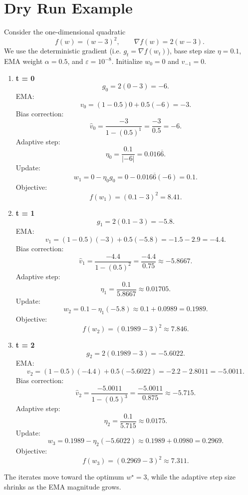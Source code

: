 \documentclass{article}
\begin{document}
\section*{Dry Run Example}
Consider the one‑dimensional quadratic
\[
f(w)=(w-3)^2,\qquad \nabla f(w)=2(w-3).
\]
We use the deterministic gradient (i.e. $g_t=\nabla f(w_t)$), base step size $\eta=0.1$, EMA weight $\alpha=0.5$, and $\varepsilon=10^{-8}$.  
Initialize $w_0=0$ and $v_{-1}=0$.

\begin{enumerate}[label=\textbf{Iteration \arabic*:}]
\item \textbf{t = 0}
    \[
    g_0=2(0-3)=-6.
    \]
    EMA:
    \[
    v_0=(1-0.5)0+0.5(-6)=-3.
    \]
    Bias correction:
    \[
    \hat v_0=\frac{-3}{1-(0.5)^{1}}=\frac{-3}{0.5}=-6.
    \]
    Adaptive step:
    \[
    \eta_0=\frac{0.1}{|{-6}|}=0.016\overline{6}.
    \]
    Update:
    \[
    w_1=0-\eta_0 g_0=0-0.016\overline{6}(-6)=0.1.
    \]
    Objective:
    \[
    f(w_1)=(0.1-3)^2=8.41.
    \]

\item \textbf{t = 1}
    \[
    g_1=2(0.1-3)=-5.8.
    \]
    EMA:
    \[
    v_1=(1-0.5)(-3)+0.5(-5.8)=-1.5-2.9=-4.4.
    \]
    Bias correction:
    \[
    \hat v_1=\frac{-4.4}{1-(0.5)^{2}}=\frac{-4.4}{0.75}\approx-5.8667.
    \]
    Adaptive step:
    \[
    \eta_1=\frac{0.1}{5.8667}\approx0.01705.
    \]
    Update:
    \[
    w_2=0.1-\eta_1(-5.8)\approx0.1+0.0989=0.1989.
    \]
    Objective:
    \[
    f(w_2)=(0.1989-3)^2\approx7.846.
    \]

\item \textbf{t = 2}
    \[
    g_2=2(0.1989-3)=-5.6022.
    \]
    EMA:
    \[
    v_2=(1-0.5)(-4.4)+0.5(-5.6022)=-2.2-2.8011=-5.0011.
    \]
    Bias correction:
    \[
    \hat v_2=\frac{-5.0011}{1-(0.5)^{3}}=\frac{-5.0011}{0.875}\approx-5.715.
    \]
    Adaptive step:
    \[
    \eta_2=\frac{0.1}{5.715}\approx0.0175.
    \]
    Update:
    \[
    w_3=0.1989-\eta_2(-5.6022)\approx0.1989+0.0980=0.2969.
    \]
    Objective:
    \[
    f(w_3)=(0.2969-3)^2\approx7.311.
    \]
\end{enumerate}
The iterates move toward the optimum $w^\star=3$, while the adaptive step size shrinks as the EMA magnitude grows.

\newpage
\end{document}
